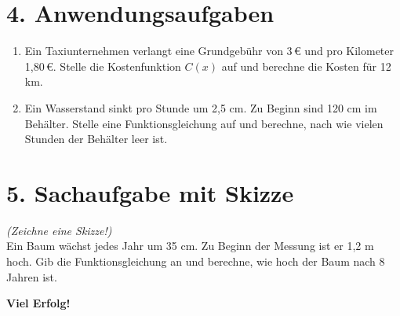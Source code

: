 \section*{4. Anwendungsaufgaben}
\begin{enumerate}[label=\alph*)]
  \item Ein Taxiunternehmen verlangt eine Grundgebühr von 3\,€ und pro Kilometer 1,80\,€. Stelle die Kostenfunktion $C(x)$ auf und berechne die Kosten für 12 km.\\[4em]
  \item Ein Wasserstand sinkt pro Stunde um 2,5 cm. Zu Beginn sind 120 cm im Behälter. Stelle eine Funktionsgleichung auf und berechne, nach wie vielen Stunden der Behälter leer ist.\\[4em]
\end{enumerate}

\section*{5. Sachaufgabe mit Skizze}
\textit{(Zeichne eine Skizze!)}\\
Ein Baum wächst jedes Jahr um 35 cm. Zu Beginn der Messung ist er 1,2 m hoch. Gib die Funktionsgleichung an und berechne, wie hoch der Baum nach 8 Jahren ist.

\vspace{2em}

\textbf{Viel Erfolg!}